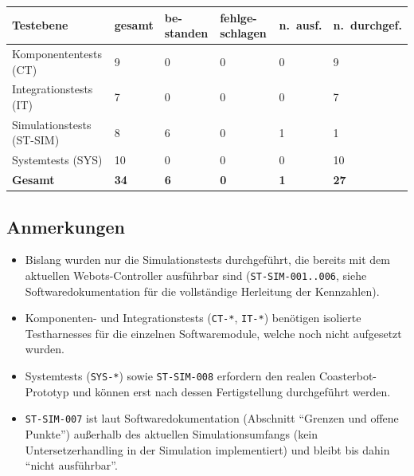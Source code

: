 \documentclass[
  a4paper,
  12pt,
  DIV=12,        %
  parskip=half,  %
  headings=small %
]{scrartcl}
\theoremstyle{definition}
\providecommand{\tightlist}{%
  \setlength{\itemsep}{0pt}\setlength{\parskip}{0pt}}
\theoremstyle{definition}
\begin{document}
\begin{longtable}[]{@{}p{}p{}p{}p{}p{}p{}@{}}
\toprule
\textbf{Testebene} & \textbf{gesamt} & \textbf{be-standen} & \textbf{fehlge-schlagen} & \textbf{n.\ ausf.} & \textbf{n.\ durchgef.}\\
\midrule
\endhead
\bottomrule
\endfoot
Komponententests (CT) & 9 & 0 & 0 & 0 & 9\\
Integrationstests (IT) & 7 & 0 & 0 & 0 & 7\\
Simulationstests (ST-SIM) & 8 & 6 & 0 & 1 & 1\\
Systemtests (SYS) & 10 & 0 & 0 & 0 & 10\\
\midrule
\textbf{Gesamt} & \textbf{34} & \textbf{6} & \textbf{0} & \textbf{1} & \textbf{27}\\
\end{longtable}

\subsection{Anmerkungen}\label{anmerkungen}

\begin{itemize}
\tightlist
\item
  Bislang wurden nur die Simulationstests durchgeführt, die
  bereits mit dem aktuellen Webots-Controller ausführbar sind
  (\texttt{ST-SIM-001..006}, siehe Softwaredokumentation für die
  vollständige Herleitung der Kennzahlen).
\item
  Komponenten- und Integrationstests (\texttt{CT-*}, \texttt{IT-*})
  benötigen isolierte Testharnesses für die einzelnen Softwaremodule, welche
  noch nicht aufgesetzt wurden.
\item
  Systemtests (\texttt{SYS-*}) sowie \texttt{ST-SIM-008} erfordern den
  realen Coasterbot-Prototyp und können erst nach dessen Fertigstellung
  durchgeführt werden.
\item
  \texttt{ST-SIM-007} ist laut Softwaredokumentation (Abschnitt
  \enquote{Grenzen und offene Punkte}) außerhalb des aktuellen
  Simulationsumfangs (kein Untersetzerhandling in der Simulation implementiert) und bleibt
  bis dahin \enquote{nicht ausführbar}.
\end{itemize}
\end{document}
